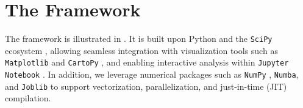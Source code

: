 \documentclass[extra,mreferee]{gji}
\theoremstyle{lemma}
\begin{document}





\section{The Framework}

The framework is illustrated in . It is built upon Python and the \texttt{SciPy} ecosystem \cite{virtanen2020scipy}, allowing seamless integration with visualization tools such as \texttt{Matplotlib} \cite{Hunter:2007} and \texttt{CartoPy} \cite{Cartopy}, and enabling interactive analysis within \texttt{Jupyter Notebook} \cite{kluyver2016jupyter}. In addition, we leverage numerical packages such as \texttt{NumPy} \cite{harris2020array}, \texttt{Numba}, and \texttt{Joblib} to support vectorization, parallelization, and just-in-time (JIT) compilation. 
\end{document}
